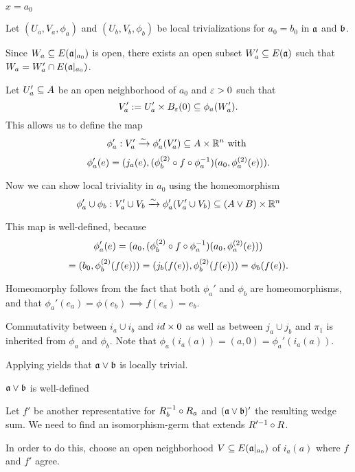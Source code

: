 \begin{myproof}
\begin{sectionize}
\begin{caselist}
            \item $x = a_0$
            
            Let $(U_a, V_a, \phi_a)$ and $(U_b, V_b, \phi_b)$ be local trivializations
            for $a_0 = b_0$ in $\mathfrak{a}$ and $\bb$.

            Since $W_a \subseteq{} E(\mathfrak{a}\vert_{a_0})$ is open,
            there exists an open subset
            $W_a' \subseteq{} E(\mathfrak{a})$ such that $W_a = W_a' \cap E(\mathfrak{a}\vert_{a_0})$.

            Let $U_a' \subseteq{} A$ be an open neighborhood of $a_0$ and $\varepsilon{} > 0$ such that
            \[ V_a' := U_a' \cross \ball[\eps] \sub \phi_a(W_a'). \]
            This allows us to define the map
            \[ \phi_a': V_a' \xrightarrow{\sim} \phi_a'(V_a') \subseteq{} A \times \mathbb{R}^n \text{ with } \]
            \[ \phi_a'(e) = (j_a(e), (\phi_b^{(2)} \circ f \circ \phi_a^{-1})(a_0, \phi_a^{(2)}(e))). \]

            Now we can show local triviality in $a_0$ using the homeomorphism
            \[ \phi_a' \cup \phi_b: V_a' \cup V_b \xrightarrow{\sim} \phi_a'(V_a' \cup V_b) \subseteq{} (A \vee B) \times \mathbb{R}^n \]

            This map is well-defined, because
            \[ \phi_a'(e) = (a_0, (\phi_b^{(2)} \circ f \circ \phi_a^{-1})(a_0, \phi_a^{(2)}(e))) \]
            \[ = (b_0, \phi_b^{(2)}(f(e))) = (j_b(f(e)), \phi_b^{(2)}(f(e))) = \phi_b(f(e)). \]

            Homeomorphy follows from the fact
            that both $\phi_a'$ and $\phi_b$ are homeomorphisms,
            and that $\phi_a'(e_a) = \phi(e_b) \implies f(e_a) = e_b$. 

            Commutativity between $i_a \cup i_b$ and $id \times 0$
            as well as between $j_a \cup j_b$ and $\pi_1$
            is inherited from $\phi_a$ and $\phi_b$.
            Note that $\phi_a(i_a(a)) = (a, 0) = \phi_a'(i_a(a))$.

            Applying  yields that $\ba \vee \bb$ is locally trivial.
        \end{caselist}
        
        \item $\ba \vee \bb$ is well-defined

        Let $f'$ be another representative for $R_b^{-1} \circ R_a$ and $(\ba \vee \bb)'$ the resulting wedge sum.
        We need to find an isomorphism-germ that extends $R'^{-1} \circ R$.
        
        In order to do this,
        choose an open neighborhood $V \subseteq{} E(\mathfrak{a}\vert_{a_0})$
        of $i_a(a)$ where $f$ and $f'$ agree.
        

\end{sectionize}
\end{myproof}
